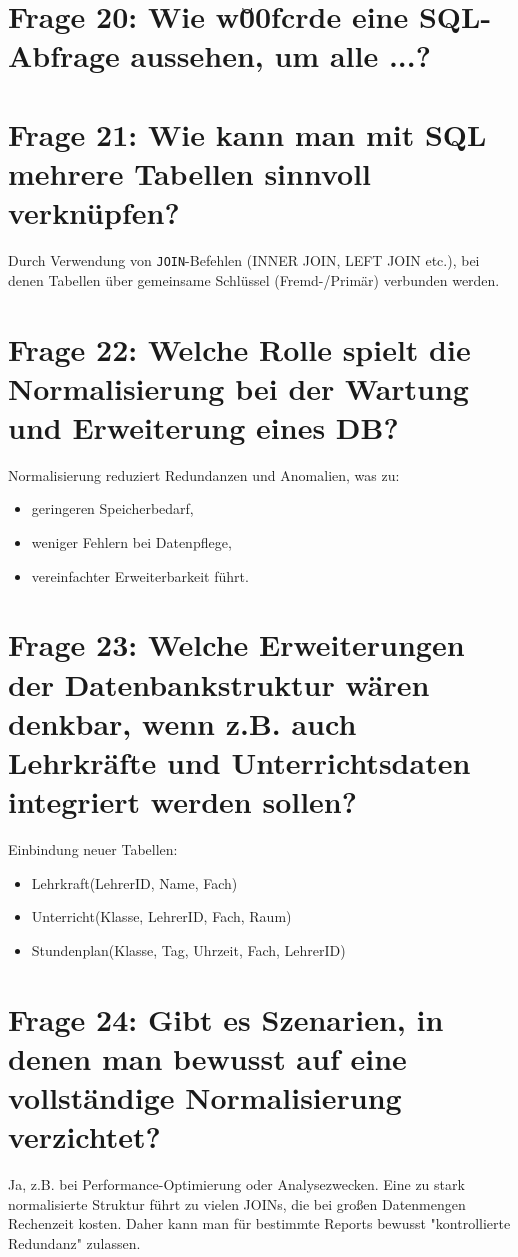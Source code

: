 \documentclass{article}
\begin{document}
\section*{Frage 20: Wie w\u00fcrde eine SQL-Abfrage aussehen, um alle ...?}

\section*{Frage 21: Wie kann man mit SQL mehrere Tabellen sinnvoll verknüpfen?}
	Durch Verwendung von \texttt{JOIN}-Befehlen (INNER JOIN, LEFT JOIN etc.), bei denen Tabellen über gemeinsame Schlüssel (Fremd-/Primär) verbunden werden.
	
\section*{Frage 22: Welche Rolle spielt die Normalisierung bei der Wartung und Erweiterung eines DB?}
	Normalisierung reduziert Redundanzen und Anomalien, was zu:
\begin{itemize}
	\item geringeren Speicherbedarf,
	\item weniger Fehlern bei Datenpflege,
	\item vereinfachter Erweiterbarkeit führt.
\end{itemize}

\section*{Frage 23: Welche Erweiterungen der Datenbankstruktur wären denkbar, wenn z.B. auch Lehrkräfte und Unterrichtsdaten integriert werden sollen?}
	Einbindung neuer Tabellen:
\begin{itemize}
	\item Lehrkraft(LehrerID, Name, Fach)
	\item Unterricht(Klasse, LehrerID, Fach, Raum)
	\item Stundenplan(Klasse, Tag, Uhrzeit, Fach, LehrerID)
\end{itemize}

\section*{Frage 24: Gibt es Szenarien, in denen man bewusst auf eine vollständige Normalisierung verzichtet?}
	Ja, z.B. bei Performance-Optimierung oder Analysezwecken. Eine zu stark normalisierte Struktur führt zu vielen JOINs, die bei großen Datenmengen Rechenzeit kosten. Daher kann man für bestimmte Reports bewusst "kontrollierte Redundanz" zulassen.
	
\end{document}
